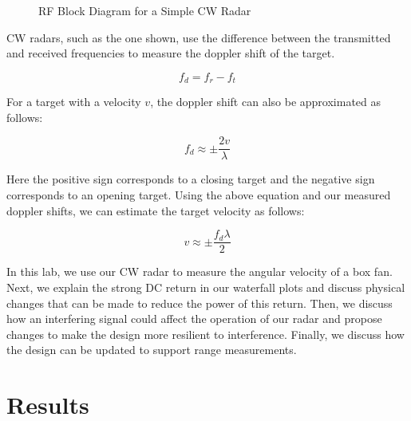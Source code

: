 \documentclass{article}
\begin{document}
\begin{figure}[H]
    	\centering
    	\caption{RF Block Diagram for a Simple CW Radar \cite{charvat_2011_build}}
    	\label{fig::cw_radar_block_diagram}
\end{figure}

\noindent CW radars, such as the one shown, use the difference between the transmitted and received frequencies to measure the doppler shift of the target.

\begin{equation*}
	f_d = f_r - f_t
\end{equation*}

\noindent For a target with a velocity $v$, the doppler shift can also be approximated as follows:

\begin{equation*}
	\label{eq::dopp_shift}
	f_d \approx \pm\frac{2v}{\lambda}
\end{equation*}

\noindent Here the positive sign corresponds to a closing target and the negative sign corresponds to an opening target. Using the above equation and our measured doppler shifts, we can estimate the target velocity as follows:

\begin{equation*}
	v \approx \pm\frac{f_d\lambda}{2}
\end{equation*}

\noindent In this lab, we use our CW radar to measure the angular velocity of a box fan. Next, we explain the strong DC return in our waterfall plots and discuss physical changes that can be made to reduce the power of this return. Then, we discuss how an interfering signal could affect the operation of our radar and propose changes to make the design more resilient to interference. Finally, we discuss how the design can be updated to support range measurements.

\section{Results}
\end{document}
